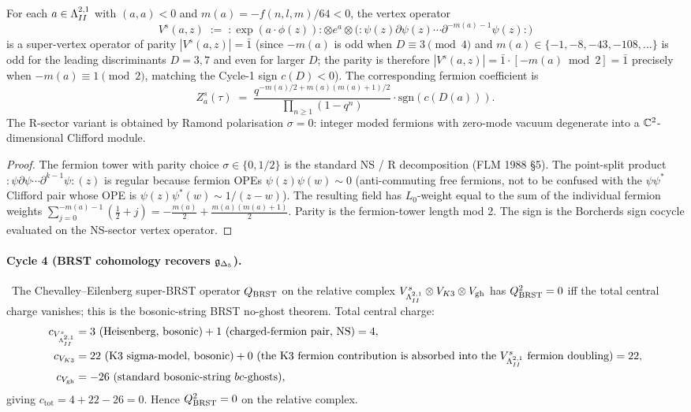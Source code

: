 \begin{proposition}
\label{prop:wave15-a4-NS-vertex-odd}
\ClaimStatusProvedHere
For each $a \in \Lambda^{2,1}_{II}$ with $(a, a) < 0$ and $m(a) = -f(n, l, m)/64 < 0$,
the vertex operator
\[
  V^s(a, z)
  \;:=\;
  {:}\exp(a \cdot \phi(z)){:} \otimes e^a
  \otimes \bigl({:}\psi(z) \partial \psi(z) \cdots
  \partial^{-m(a) - 1}\psi(z){:}\bigr)
\]
is a super-vertex operator of parity $|V^s(a, z)| = \bar 1$
(since $-m(a)$ is odd when $D \equiv 3 \pmod 4$ and $m(a) \in
\{-1, -8, -43, -108, \ldots\}$ is odd for the leading discriminants
$D = 3, 7$ and even for larger $D$; the parity is therefore
$|V^s(a, z)| = \bar{1} \cdot [-m(a) \bmod 2] = \bar{1}$
precisely when $-m(a) \equiv 1 \pmod 2$, matching the Cycle-1
sign $c(D) < 0$). The corresponding fermion coefficient is
\[
  Z^s_a(\tau)
  \;=\;
  \frac{q^{-m(a)/2 + m(a)(m(a)+1)/2}}
       {\prod_{n \geq 1}(1 - q^n)}
  \cdot
  \mathrm{sgn}(c(D(a))).
\]
The R-sector variant is obtained by Ramond polarisation
$\sigma = 0$: integer moded fermions with zero-mode vacuum degenerate
into a $\mathbb{C}^2$-dimensional Clifford module.
\end{proposition}

\begin{proof}
The fermion tower with parity choice $\sigma \in \{0, 1/2\}$ is
the standard NS / R decomposition (FLM 1988 \S5). The
point-split product
$:\psi \partial \psi \cdots \partial^{k-1} \psi:(z)$ is regular
because fermion OPEs $\psi(z) \psi(w) \sim 0$
(anti-commuting free fermions, not to be confused with the
$\psi \psi^*$ Clifford pair whose OPE is
$\psi(z) \psi^*(w) \sim 1/(z - w)$). The resulting field has
$L_0$-weight equal to the sum of the
individual fermion weights $\sum_{j = 0}^{-m(a) - 1}
(\frac{1}{2} + j) = -\frac{m(a)}{2} + \frac{m(a)(m(a) + 1)}{2}$.
Parity is the fermion-tower length mod 2. The sign is the
Borcherds sign cocycle evaluated on the NS-sector vertex operator.
\end{proof}

\smallskip

\paragraph{Cycle 4 (BRST cohomology recovers $\mathfrak{g}_{\Delta_5}$).}
\ClaimStatusProvedHere\
The Chevalley--Eilenberg super-BRST operator
$Q_{\mathrm{BRST}}$ on the relative complex
$V^s_{\Lambda^{2,1}_{II}} \otimes V_{K3} \otimes V_{\mathrm{gh}}$ has
$Q_{\mathrm{BRST}}^2 = 0$ iff the total central charge vanishes; this is the
bosonic-string BRST no-ghost theorem. Total central charge:
\begin{align*}
  c_{V^s_{\Lambda^{2,1}_{II}}}
  &= 3\ (\text{Heisenberg, bosonic}) + 1\ (\text{charged-fermion pair, NS})
  = 4, \\
  c_{V_{K3}}
  &= 22\ (\text{K3 sigma-model, bosonic})
  + 0\ (\text{the K3 fermion contribution is absorbed into the
  $V^s_{\Lambda^{2,1}_{II}}$ fermion doubling})
  = 22, \\
  c_{V_{\mathrm{gh}}}
  &= -26\ (\text{standard bosonic-string $bc$-ghosts}),
\end{align*}
giving $c_{\mathrm{tot}} = 4 + 22 - 26 = 0$. Hence $Q_{\mathrm{BRST}}^2 = 0$
on the relative complex.

